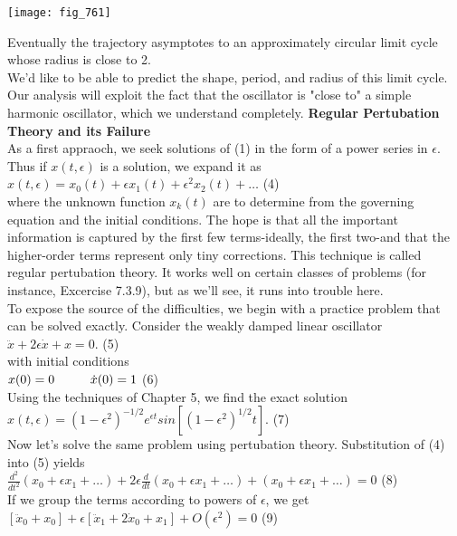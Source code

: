 \documentclass{article}
\newcommand\tab[1][1cm]{\hspace*{#1}}
\begin{document}
\texttt{[image: fig\_761]}

Eventually the trajectory asymptotes to an approximately circular limit cycle whose radius is close to 2. \\ \tab
We'd like to be able to predict the shape, period, and radius of this limit cycle. Our analysis will exploit the fact that the oscillator is "close to" a simple harmonic oscillator, which we understand completely. 
\textbf {Regular Pertubation Theory and its Failure} \\ \tab
As a first appraoch, we seek solutions of (1) in the form of a power series in $\epsilon$. Thus if $x(t,\epsilon)$ is a solution, we expand it as \\ \tab
$x(t, \epsilon)=x_{0}(t) + \epsilon x_{1}(t) + \epsilon^{2}x_{2}(t)+\hdots$ \tab (4) \\
where the unknown function $x_{k}(t)$ are to determine from the governing equation and the initial conditions. The hope is that all the important information is captured by the first few terms-ideally, the first two-and that the higher-order terms represent only tiny corrections. This technique is called regular pertubation theory. It works well on certain classes of problems (for instance, Excercise 7.3.9), but as we'll see, it runs into trouble here. \\
To expose the source of the difficulties, we begin with a practice problem that can be solved exactly. Consider the weakly damped linear oscillator \\ 
\tab $\ddot{x}+2\epsilon \dot{x}+x=0$. \tab (5) \\
with initial conditions \\ \tab
$x(0)=0 \tab \dot{x}(0)=1$ \tab (6) \\
Using the techniques of Chapter 5, we find the exact solution \\
$x(t, \epsilon)=(1-\epsilon^{2})^{-1/2} e^{\epsilon t}sin[(1-\epsilon^{2})^{1/2} t]$. \tab (7) \\
Now let's solve the same problem using pertubation theory. Substitution of (4) into (5) yields \\ \tab
$\frac{d^{2}}{dt^{2}}(x_{0}+\epsilon x_{1}+\hdots)+2\epsilon {\frac{d}{dt}(x_{0}+\epsilon x_{1}+\hdots)}+(x_{0}+\epsilon x_{1}+\hdots)=0$ \tab (8) \\
If we group the terms according to powers of $\epsilon$, we get \\
$[\ddot{x}_{0}+x_{0}]+\epsilon[\ddot{x}_{1}+2\dot{x}_{0}+x_{1}]+O(\epsilon^{2})=0$ \tab (9) \\
\end{document}
